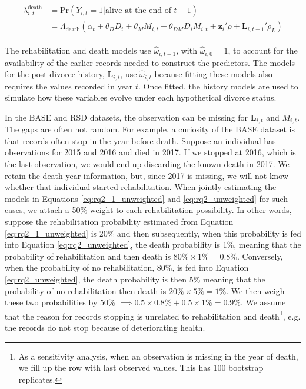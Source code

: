 \documentclass[a4paper,12pt]{article}
\theoremstyle{plain}
\theoremstyle{definition}
\theoremstyle{TheoremNum}
\theoremstyle{CorollaryNum}
\theoremstyle{PropositionNum}
\theoremstyle{TheoremNum}
\begin{document}
\begin{align}
\begin{split}
\lambda_{i,t}^{\text{death}} & = \text{Pr}(Y_{i,t}=1| \text{alive at the end of } t-1) \\
& = \Lambda_{\text{death}}\left(\alpha_t + \theta_D D_i + \theta_M M_{i,t} + \theta_{DM} D_iM_{i,t} + \mathbf{z}_i' \rho + \mathbf{L}_{i,t-1}'\rho_L\right)
\end{split}
\tag{6}\label{eq:rq2_unweighted}
\end{align}

The rehabilitation and death models use $\hat{\omega}_{i,t-1}$, with $\hat{\omega}_{i,0}=1$, to account for the availability of the earlier records needed to construct the predictors. The models for the post-divorce history, $\mathbf{L}_{i,t}$, use $\hat{\omega}_{i,t}$ because fitting these models also requires the values recorded in year $t$. Once fitted, the history models are used to simulate how these variables evolve under each hypothetical divorce status.

In the BASE and RSD datasets, the observation can be missing for $\mathbf{L}_{i,t}$ and $M_{i,t}$. The gaps are often not random. For example, a curiosity of the BASE dataset is that records often stop in the year before death. Suppose an individual has observations for 2015 and 2016 and died in 2017. If we stopped at 2016, which is the last observation, we would end up discarding the known death in 2017. We retain the death year information, but, since 2017 is missing, we will not know whether that individual started rehabilitation. When jointly estimating the models in Equations \ref{eq:rq2_1_unweighted} and \ref{eq:rq2_unweighted} for such cases, we attach a 50\% weight to each rehabilitation possibility. In other words, suppose the rehabilitation probability estimated from Equation \ref{eq:rq2_1_unweighted} is 20\% and then subsequently, when this probability is fed into Equation \ref{eq:rq2_unweighted}, the death probability is 1\%, meaning that the probability of rehabilitation and then death is $80\% \times 1\% = 0.8\%$. Conversely, when the probability of no rehabilitation, 80\%, is fed into Equation \ref{eq:rq2_unweighted}, the death probability is then 5\% meaning that the probability of no rehabilitation then death is $20\% \times 5\% = 1\%$. We then weigh these two probabilities by 50\% $\implies 0.5 \times 0.8\% + 0.5\times 1\% = 0.9\%$. We assume that the reason for records stopping is unrelated to rehabilitation and death\footnote{As a sensitivity analysis, when an observation is missing in the year of death, we fill up the row with last observed values. This has 100 bootstrap replicates.}, e.g. the records do not stop because of deteriorating health.
\end{document}
